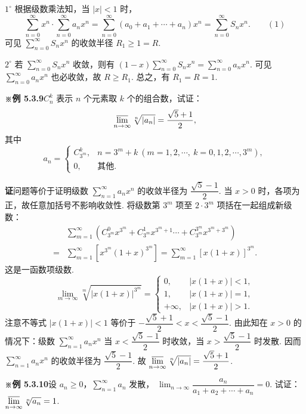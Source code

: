 \documentclass[UTF8, 12pt, fontset=fandol, oneside]{ctexart}
\begin{document}
$1^\circ$ 根据级数乘法知，当 $|x|<1$ 时，
\[
  \sum_{n=0}^{\infty}x^n\cdot\sum_{n=0}^{\infty}a_nx^n
  =\sum_{n=0}^{\infty}(a_0+a_1+\cdots+a_n)x^n
  =\sum_{n=0}^{\infty}S_nx^n.
\qquad(1)
\]
可见 $\displaystyle\sum_{n=0}^{\infty}S_nx^n$ 的收敛半径 $R_1\ge1=R$.

$2^\circ$ 若 $\displaystyle\sum_{n=0}^{\infty}S_nx^n$ 收敛，则有
$(1-x)\displaystyle\sum_{n=0}^{\infty}S_nx^n=\displaystyle\sum_{n=0}^{\infty}a_nx^n$. 可见
$\displaystyle\sum_{n=0}^{\infty}a_nx^n$ 也必收敛，故 $R\ge R_1$. 总之，有 $R_1=R=1$.

\noindent\textbf{※例 5.3.9}\quad $C_n^k$ 表示 $n$ 个元素取 $k$ 个的组合数，试证：
\[
  \varlimsup_{n\to\infty}\sqrt[n]{|a_n|}=\frac{\sqrt5+1}{2},
\]
其中
\[
  a_n=
  \begin{cases}
    C_{3^m}^{k},&n=3^m+k\ (m=1,2,\cdots,\ k=0,1,2,\cdots,3^m),\\
    0,&\text{其他}.
  \end{cases}
\]

\noindent\textbf{证}\quad 问题等价于证明级数
$\displaystyle\sum_{n=1}^{\infty}a_nx^n$ 的收敛半径为 $\dfrac{\sqrt5-1}{2}$. 当 $x>0$ 时，各项为正，故任意加括号不影响收敛性.
将级数第 $3^m$ 项至 $2\cdot3^m$ 项括在一起组成新级数：
\[
\begin{aligned}
&\sum_{m=1}^{\infty}\left(C_{3^m}^0x^{3^m}+C_{3^m}^1x^{3^m+1}
\cdots+C_{3^m}^{3^m}x^{3^m+3^m}\right)\\
={}&\sum_{m=1}^{\infty}\left[x^{3^m}(1+x)^{3^m}\right]
=\sum_{m=1}^{\infty}[x(1+x)]^{3^m}.
\end{aligned}
\]
这是一函数项级数.
\[
  \lim_{m\to\infty}\sqrt[m]{|x(1+x)|^{3^m}}=
  \begin{cases}
    0,&|x(1+x)|<1,\\
    1,&|x(1+x)|=1,\\
    +\infty,&|x(1+x)|>1.
  \end{cases}
\]
注意不等式 $|x(1+x)|<1$ 等价于
$-\dfrac{\sqrt5+1}{2}<x<\dfrac{\sqrt5-1}{2}$. 由此知在 $x>0$ 的情况下：级数
$\displaystyle\sum_{n=1}^{\infty}a_nx^n$ 当 $x<\dfrac{\sqrt5-1}{2}$ 时收敛，当
$x>\dfrac{\sqrt5-1}{2}$ 时发散. 因而 $\displaystyle\sum_{n=1}^{\infty}a_nx^n$ 的收敛半径为
$\dfrac{\sqrt5-1}{2}$. 故
$\displaystyle\varlimsup_{n\to\infty}\sqrt[n]{|a_n|}=\dfrac{\sqrt5+1}{2}$.

\noindent\textbf{※例 5.3.10}\quad 设 $a_n\ge0$，$\displaystyle\sum_{n=1}^{\infty}a_n$ 发散，
$\displaystyle\lim_{n\to\infty}\dfrac{a_n}{a_1+a_2+\cdots+a_n}=0$. 试证：
$\displaystyle\varlimsup_{n\to\infty}\sqrt[n]{a_n}=1$.
\end{document}
